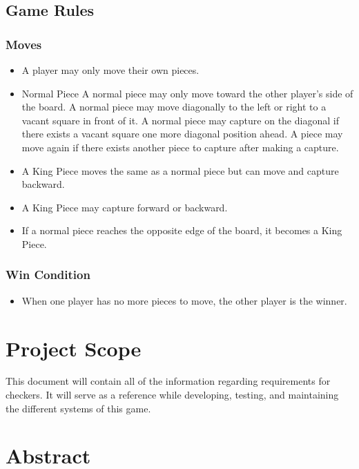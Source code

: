 \documentclass{scrreprt}
\begin{document}
\subsection{Game Rules}

\subsubsection{Moves}
\begin{itemize}
    \item A player may only move their own pieces.
    \item Normal Piece
        \subitem A normal piece may only move toward the other player's side of the board.
        \subitem A normal piece may move diagonally to the left or right to a vacant square in front of it.
        \subitem A normal piece may capture on the diagonal if there exists a vacant square one more diagonal position ahead.
            \subsubitem A piece may move again if there exists another piece to capture after making a capture.
    \item A King Piece moves the same as a normal piece but can move and capture backward.
    \item A King Piece may capture forward or backward.
    \item If a normal piece reaches the opposite edge of the board, it becomes a King Piece.
\end{itemize}

\subsubsection{Win Condition}
\begin{itemize}
    \item When one player has no more pieces to move, the other player is the winner.
\end{itemize}

\section{Project Scope}

This document will contain all of the information regarding requirements for checkers.
It will serve as a reference while developing, testing, and maintaining the different systems of this game.

\section{Abstract}
\end{document}
